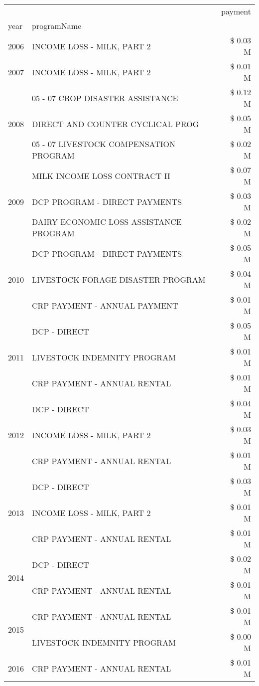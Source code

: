 \begin{tabular}{llr}
\toprule
 &  & payment \\
year & programName &  \\
\midrule
2006 & INCOME LOSS - MILK, PART 2 & \$ 0.03 M \\
\cline{1-3}
2007 & INCOME LOSS - MILK, PART 2 & \$ 0.01 M \\
\cline{1-3}
\multirow[t]{3}{*}{2008} & 05 - 07 CROP DISASTER ASSISTANCE & \$ 0.12 M \\
 & DIRECT AND COUNTER CYCLICAL PROG & \$ 0.05 M \\
 & 05 - 07 LIVESTOCK COMPENSATION PROGRAM & \$ 0.02 M \\
\cline{1-3}
\multirow[t]{3}{*}{2009} & MILK INCOME LOSS CONTRACT II & \$ 0.07 M \\
 & DCP PROGRAM - DIRECT PAYMENTS & \$ 0.03 M \\
 & DAIRY ECONOMIC LOSS ASSISTANCE PROGRAM & \$ 0.02 M \\
\cline{1-3}
\multirow[t]{3}{*}{2010} & DCP PROGRAM - DIRECT PAYMENTS & \$ 0.05 M \\
 & LIVESTOCK FORAGE DISASTER  PROGRAM & \$ 0.04 M \\
 & CRP PAYMENT - ANNUAL PAYMENT & \$ 0.01 M \\
\cline{1-3}
\multirow[t]{3}{*}{2011} & DCP - DIRECT & \$ 0.05 M \\
 & LIVESTOCK INDEMNITY PROGRAM & \$ 0.01 M \\
 & CRP PAYMENT - ANNUAL RENTAL & \$ 0.01 M \\
\cline{1-3}
\multirow[t]{3}{*}{2012} & DCP - DIRECT & \$ 0.04 M \\
 & INCOME LOSS - MILK, PART 2 & \$ 0.03 M \\
 & CRP PAYMENT - ANNUAL RENTAL & \$ 0.01 M \\
\cline{1-3}
\multirow[t]{3}{*}{2013} & DCP - DIRECT & \$ 0.03 M \\
 & INCOME LOSS - MILK, PART 2 & \$ 0.01 M \\
 & CRP PAYMENT - ANNUAL RENTAL & \$ 0.01 M \\
\cline{1-3}
\multirow[t]{2}{*}{2014} & DCP - DIRECT & \$ 0.02 M \\
 & CRP PAYMENT - ANNUAL RENTAL & \$ 0.01 M \\
\cline{1-3}
\multirow[t]{2}{*}{2015} & CRP PAYMENT - ANNUAL RENTAL & \$ 0.01 M \\
 & LIVESTOCK INDEMNITY PROGRAM & \$ 0.00 M \\
\cline{1-3}
\multirow[t]{3}{*}{2016} & CRP PAYMENT - ANNUAL RENTAL & \$ 0.01 M \\

\end{tabular}
